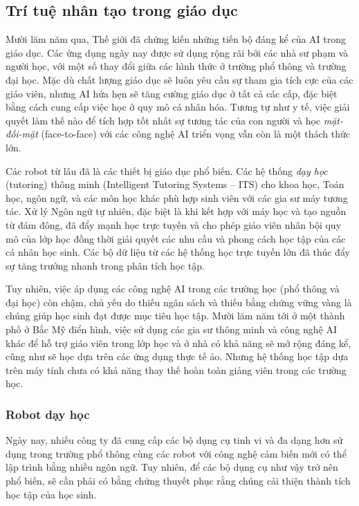 \subsection{Trí tuệ nhân tạo trong giáo dục}
Mười lăm năm qua, Thế giới đã chứng kiến những tiến bộ đáng kể của AI trong giáo dục. Các ứng dụng ngày nay được sử dụng rộng rãi bởi các nhà sư phạm và người học, với một số thay đổi giữa các hình thức ở trường phổ thông và trường đại học. Mặc dù chất lượng giáo dục sẽ luôn yêu cầu sự tham gia tích cực của các giáo viên, nhưng AI hứa hẹn sẽ tăng cường giáo dục ở tất cả các cấp, đặc biệt bằng cách cung cấp việc học ở quy mô cá nhân hóa. Tương tự như y tế, việc giải quyết làm thế nào để tích hợp tốt nhất sự tương tác của con người và học \textit{mặt-đối-mặt} (face-to-face) với các công nghệ AI triển vọng vẫn còn là một thách thức lớn.\par
Các robot từ lâu đã là các thiết bị giáo dục phổ biến. Các hệ thống \textit{dạy học} (tutoring) thông minh (Intelligent Tutoring Systems – ITS) cho khoa học, Toán học, ngôn ngữ, và các môn học khác phù hợp sinh viên với các gia sư máy tương tác. Xử lý Ngôn ngữ tự nhiên, đặc biệt là khi kết hợp với máy học và tạo nguồn từ đám đông, đã đẩy mạnh học trực tuyến và cho phép giáo viên nhân bội quy mô của lớp học đồng thời giải quyết các nhu cầu và phong cách học tập của các cá nhân học sinh. Các bộ dữ liệu từ các hệ thống học trực tuyến lớn đã thúc đẩy sự tăng trưởng nhanh trong phân tích học tập.\par
Tuy nhiên, việc áp dụng các công nghệ AI trong các trường học (phổ thông và đại học) còn chậm, chủ yếu do thiếu ngân sách và thiếu bằng chứng vững vàng là chúng giúp học sinh đạt được mục tiêu học tập. Mười lăm năm tới ở một thành phố ở Bắc Mỹ điển hình, việc sử dụng các gia sư thông minh và công nghệ AI khác để hỗ trợ giáo viên trong lớp học và ở nhà có khả năng sẽ mở rộng đáng kể, cũng như sẽ học dựa trên các ứng dụng thực tế ảo. Nhưng hệ thống học tập dựa trên máy tính chưa có khả năng thay thế hoàn toàn giảng viên trong các trường học.\par
\subsubsection{Robot dạy học}
Ngày nay, nhiều công ty đã cung cấp các bộ dụng cụ tinh vi và đa dạng hơn sử dụng trong trường phổ thông cùng các robot với công nghệ cảm biến mới có thể lập trình bằng nhiều ngôn ngữ. Tuy nhiên, để các bộ dụng cụ như vậy trở nên phổ biến, sẽ cần phải có bằng chứng thuyết phục rằng chúng cải thiện thành tích học tập của học sinh.
